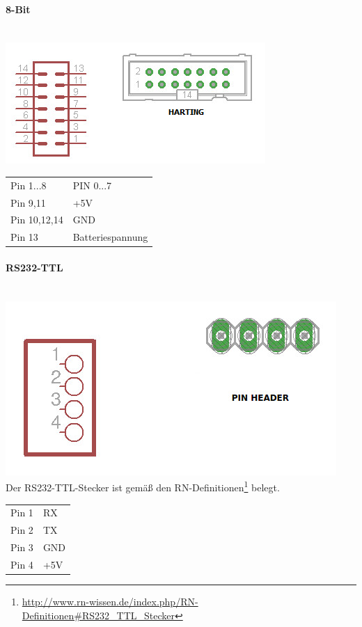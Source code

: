 \documentclass[a4paper,10pt]{article}
\begin{document}
\paragraph{8-Bit} \mbox{} \\


\includegraphics[scale=0.6]{connector_8-bit}
\begin{center}
    \begin{tabular}{| l | l |}
    \hline
    Pin 1...8 	& PIN 0...7 \\ 
    Pin 9,11	& +5V \\
    Pin 10,12,14& GND \\ 
    Pin 13 	& Batteriespannung \\ \hline
    \end{tabular}
\end{center}

\paragraph{RS232-TTL} \mbox{} \\


\includegraphics[scale=0.6]{connector_rs232-ttl} \\
Der RS232-TTL-Stecker ist gemäß den RN-Definitionen\footnote{\url{http://www.rn-wissen.de/index.php/RN-Definitionen\#RS232_TTL_Stecker}} belegt.
\begin{center}
    \begin{tabular}{| l | l |}
    \hline
    Pin 1 	& RX \\ 
    Pin 2	& TX \\
    Pin 3	& GND \\ 
    Pin 4 	& +5V \\ \hline
    \end{tabular}
\end{center}
\end{document}
